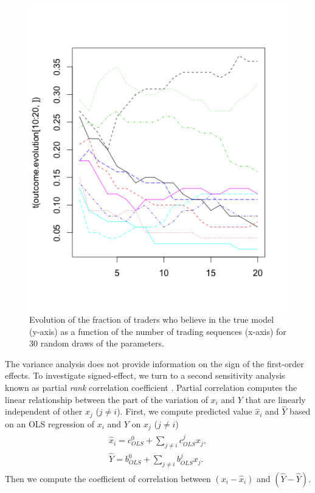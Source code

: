 \documentclass{sig-alternate}
\begin{document}
\begin{figure}
		\includegraphics[scale = 0.4]{Rplot03.png}
		\caption{Evolution of the fraction of traders who believe in the true model (y-axis) as a function of the number of trading sequences (x-axis) for 30 random draws of the parameters.\label{example}}				
	\end{figure}


	The variance analysis does not provide information on the sign of the first-order effects. To investigate signed-effect, we turn to a second sensitivity analysis known as partial \emph{rank} correlation coefficient \citep{Marino2008}. Partial correlation computes the linear relationship between the part of the variation of $x_i$ and $Y$ that are linearly independent of other $x_j$  ($j \neq i$). First, we compute predicted value $\hat{x}_i$ and $\hat{Y}$ based on an OLS regression of $x_i$ and $Y$ on $x_j$  ($j\neq i$)
	\begin{align}
	\begin{split}
	\hat{x}_i = c^0_{OLS} + \sum_{j \neq i} c^j_{OLS} x_j,\\
	\hat{Y} = b^0_{OLS} + \sum_{j \neq i} b^j_{OLS} x_j.
	\end{split}
	\end{align}
	Then we compute the coefficient of correlation between $(x_i - \hat{x}_i)$ and $(\hat{Y} - \hat{Y})$. 
	
\end{document}
